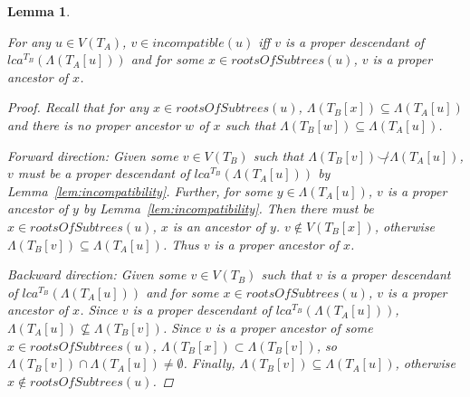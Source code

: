 \documentclass{article}
\newcommand{\compatible}{\smile}
\newcommand{\leafset}{\Lambda}
\newtheorem{incompatibilityrootsofsubtrees}[incompatibility]{Lemma}
\begin{document}
    \begin{incompatibilityrootsofsubtrees}
        \label{lem:incompatibilityrootsofsubtrees}

        For any $u \in V(T_A)$, $v \in incompatible(u)$ iff $v$ is a proper descendant of $lca^{T_B}(\leafset(T_A[u]))$ and for some $x \in rootsOfSubtrees(u)$, $v$ is a proper ancestor of $x$.

        \begin{proof}
            Recall that for any $x \in rootsOfSubtrees(u)$, $\leafset(T_B[x]) \subseteq \leafset(T_A[u])$ and there is no proper ancestor $w$ of $x$ such that $\leafset(T_B[w]) \subseteq \leafset(T_A[u])$.

            \textit{Forward direction}: Given some $v \in V(T_B)$ such that $\leafset(T_B[v]) \not\compatible \leafset(T_A[u])$, $v$ must be a proper descendant of $lca^{T_B}(\leafset(T_A[u]))$ by Lemma~\ref{lem:incompatibility}. Further, for some $y \in \leafset(T_A[u])$, $v$ is a proper ancestor of $y$ by Lemma~\ref{lem:incompatibility}. Then there must be $x \in rootsOfSubtrees(u)$, $x$ is an ancestor of $y$. $v \not\in V(T_B[x])$, otherwise $\leafset(T_B[v]) \subseteq \leafset(T_A[u])$. Thus $v$ is a proper ancestor of $x$.

            \textit{Backward direction}: Given some $v \in V(T_B)$ such that $v$ is a proper descendant of $lca^{T_B}(\leafset(T_A[u]))$ and for some $x \in rootsOfSubtrees(u)$, $v$ is a proper ancestor of $x$. Since $v$ is a proper descendant of $lca^{T_B}(\leafset(T_A[u]))$, $\leafset(T_A[u]) \not\subseteq \leafset(T_B[v])$. Since $v$ is a proper ancestor of some $x \in rootsOfSubtrees(u)$, $\leafset(T_B[x]) \subset \leafset(T_B[v])$, so $\leafset(T_B[v]) \cap \leafset(T_A[u]) \neq \emptyset$. Finally, $\leafset(T_B[v]) \subseteq \leafset(T_A[u])$, otherwise $x \not\in rootsOfSubtrees(u)$.
        \end{proof}
    \end{incompatibilityrootsofsubtrees}
\end{document}
